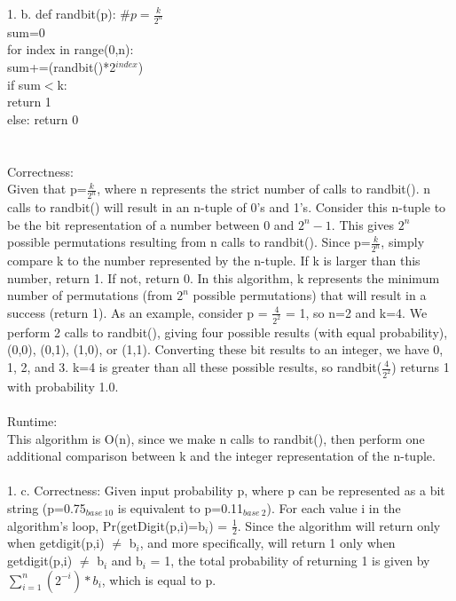\documentclass[11pt, oneside]{article}   	%
\begin{document}
1. b.  def randbit(p): \#$p=\frac{k}{2^n}$\\
\indent\indent sum=0\\
\indent\indent for index in range(0,n):\\
\indent\indent\indent sum+=(randbit()*2$^{index}$)\\
\indent\indent if sum$<$k:\\
\indent\indent\indent return 1\\
\indent\indent else: return 0\\\\\\
Correctness:\\
\indent Given that p=$\frac{k}{2^n}$, where n represents the strict number of calls to randbit().  n calls to randbit() will result in an n-tuple of 0's and 1's.  Consider this n-tuple to be the bit representation of a number between 0 and $2^n-1$.  This gives $2^n$ possible permutations resulting from n calls to randbit().  Since p=$\frac{k}{2^n}$, simply compare k to the number represented by the n-tuple.  If k is larger than this number, return 1.  If not, return 0.  In this algorithm, k represents the minimum number of permutations (from $2^n$ possible permutations) that will result in a success (return 1).  As an example, consider p = $\frac{4}{2^2}$ = 1, so n=2 and k=4.  We perform 2 calls to randbit(), giving four possible results (with equal probability),  (0,0), (0,1), (1,0), or (1,1).  Converting these bit results to an integer, we have 0, 1, 2, and 3.  k=4 is greater than all these possible results, so randbit($\frac{4}{2^2}$) returns 1 with probability 1.0.\\\\
Runtime:\\
\indent This algorithm is O(n), since we make n calls to randbit(), then perform one additional comparison between k and the integer representation of the n-tuple.\\\\
1. c.  Correctness:  Given input probability p, where p can be represented as a bit string (p=0.75$_{base\ 10}$ is equivalent to p=0.11$_{base\ 2}$).  For each value i in the algorithm's loop, Pr(getDigit(p,i)=b$_i$) = $\frac{1}{2}$.  Since the algorithm will return only when getdigit(p,i) $\neq$ b$_i$, and more specifically, will return 1 only when getdigit(p,i) $\neq$ b$_i$ and b$_i$ = 1, the total probability of returning 1 is given by $\sum_{i=1}^n (2^{-i})*b_i$, which is equal to p.\\
\end{document}
